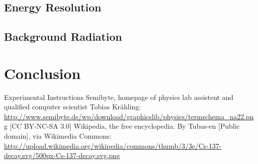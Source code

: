 \documentclass[bigchapter,colorback,accentcolor=tud4b,linedtoc,11pt]{tudreport}
\begin{document}
\section{Energy Resolution}

\section{Background Radiation}

\chapter{Conclusion}

\cleardoublepage{}
\newpage
\begin{thebibliography}{100}
   {Experimental Instructions}
   {Semibyte, homepage of physics lab assistent and qualified
      computer scientist Tobias Krähling:
      \url{http://www.semibyte.de/wp/download/graphicslib/physics/termschema_na22.png}
    [CC BY-NC-SA 3.0]}
   {Wikipedia, the free encyclopedia. By Tubas-en [Public
      domain], via Wikimedia Commons: \url{http://upload.wikimedia.org/wikipedia/commons/thumb/3/3e/Cs-137-decay.svg/500px-Cs-137-decay.svg.png}}
\end{thebibliography}
\end{document}
